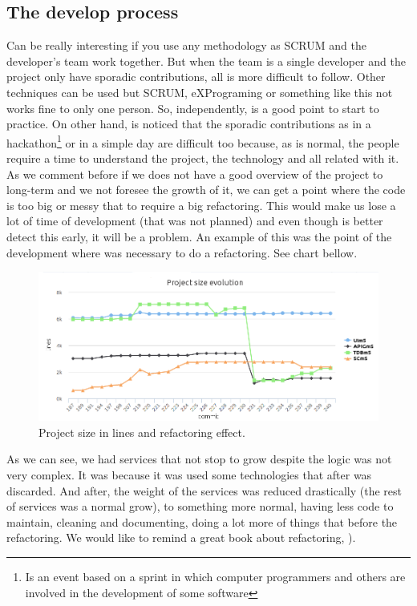\subsection{The develop process}

Can be really interesting if you use any methodology as SCRUM and the developer's
team work together. But when the team is a single developer and the project only
have sporadic contributions,
all is more difficult to follow. Other techniques can be used but SCRUM, eXPrograming
or something like this not works fine to only one person.
\intro
So, independently, is a good point to start to practice. On other hand, is
noticed that the sporadic contributions as in a hackathon\footnote{Is an event based on a sprint
in which computer programmers and others are involved in the development of some software} or
in a simple day are difficult too because, as is normal, the people require a time to understand the
project, the technology and all related with it.
\intro
As we comment before if we does not have a good overview of the project to long-term
and we not foresee the growth of it, we can get a point where the code is too big
or messy that to require a big refactoring.
This would make us lose a lot of time of development (that was not planned) and
even though is better detect this early, it will be a problem.
An example of this was the point of the development where was necessary to do a
refactoring. See chart bellow.

\begin{figure}[H]
  \includegraphics[scale=0.45]{img/graphics/repository_size.png}
  \centering
  \caption{Project size in lines and refactoring effect.}
\end{figure}

\noindent As we can see, we had services that not stop to grow despite the logic
was not very complex. It was because it was used some technologies that after was
discarded. And after, the weight of the services was reduced drastically (the rest
of services was a normal grow), to something more normal, having less code to
maintain, cleaning and documenting, doing a lot more of things that before the
refactoring. We would like to remind a great book about refactoring, \cite{refactor}).


